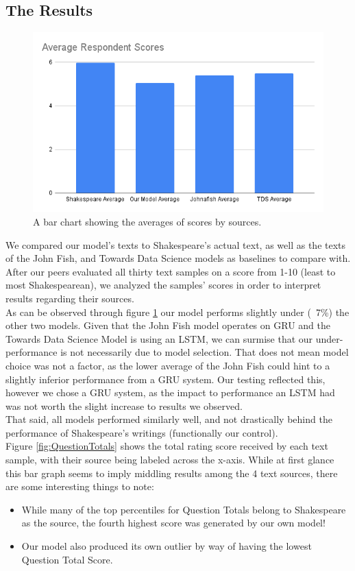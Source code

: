 \documentclass[11pt,a4paper]{article}
\begin{document}
\subsection{The Results}
\label{sec:results}
\begin{figure}
\centering
\includegraphics[width=.45\textwidth]{report/avgScores.png}
\caption{\label{fig:AverageScores}A bar chart showing the averages of scores by sources.}
\end{figure}
We compared our model’s texts to Shakespeare’s actual text, as well as the texts of the John Fish\cite{fish_johnafishshakespeare_ai_2022}, and Towards Data Science\cite{TDS_model} models as baselines to compare with. After our peers evaluated all thirty text samples on a score from 1-10 (least to most Shakespearean), we analyzed the samples’ scores in order to interpret results regarding their sources.\\
As can be observed through figure \ref{fig:AverageScores} our model performs slightly under (~7\%) the other two models. Given that the John Fish model operates on GRU and the Towards Data Science Model is using an LSTM, we can surmise that our under-performance is not necessarily due to model selection. That does not mean model choice was not a factor, as the lower average of the John Fish could hint to a slightly inferior performance from a GRU system. Our testing reflected this, however we chose a GRU system, as the impact to performance an LSTM had was not worth the slight increase to results we observed.\\ 
That said, all models performed similarly well, and not drastically behind the performance of Shakespeare's writings (functionally our control).\\
Figure \ref{fig:QuestionTotals} shows the total rating score received by each text sample, with their source being labeled across the x-axis. While at first glance this bar graph seems to imply middling results among the 4 text sources, there are some interesting things to note:
\begin{itemize}
    \item While many of the top percentiles for Question Totals belong to Shakespeare as the source, the fourth highest score was generated by our own model!
    \item Our model also produced its own outlier by way of having the lowest Question Total Score.
\end{itemize}
\end{document}
